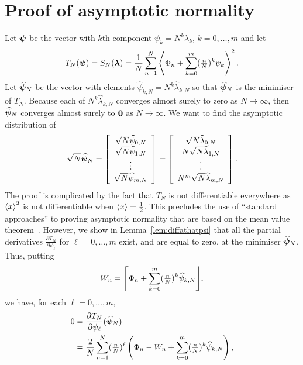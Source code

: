 \documentclass[journal]{IEEEtran}
\begin{document}
\section{Proof of asymptotic normality}\label{sec:centlimitproof}

Let $\boldsymbol{\psi}$ be the vector with $k$th component $\psi_k = N^k \lambda_k$, $k=0, \dots, m$ and let 
\[
T_{N}(\boldsymbol{\psi}) = S_N(\boldsymbol{\lambda}) = \frac{1}{N} \sum_{n=1}^{N} \left\langle  \Phi_n + \sum_{k=0}^m (\tfrac{n}{N})^k \psi_k  \right\rangle^2.
\]
Let $\widehat{\boldsymbol{\psi}}_N$ be the vector with elements $\widehat{\psi}_{k,N} = N^k \widehat{\lambda}_{k,N}$ so that $\widehat{\boldsymbol{\psi}}_N$ is the minimiser of $T_N$.  Because each of $N^k \widehat{\lambda}_{k,N}$ converges almost surely to zero as $N \rightarrow \infty$, then $\widehat{\boldsymbol{\psi}}_{N}$ converges almost surely to $\boldsymbol{0}$ as $N \rightarrow \infty$.  We want to find the asymptotic distribution of
\[
\sqrt{N}\widehat{\psibf}_{N} = 
\left[
\begin{array}
[c]{c}%
\sqrt{N} \widehat{\psi}_{0,N} \\ \sqrt{N}\widehat{\psi}_{1,N}  \\ \vdots \\ \sqrt{N} \widehat{\psi}_{m,N}
\end{array}
\right]
=
\left[
\begin{array}
[c]{c}%
\sqrt{N} \widehat{\lambda}_{0,N} \\ N\sqrt{N}\widehat{\lambda}_{1,N} \\ \vdots \\ N^m\sqrt{N} \widehat{\lambda}_{m,N}
\end{array}
\right].
\]
The proof is complicated by the fact that $T_N$ is not differentiable everywhere as $\left\langle x \right\rangle^2$ is not differentiable when $\left\langle x \right\rangle = \tfrac{1}{2}$.  This precludes the use of ``standard approaches'' to proving asymptotic normality that are based on the mean value theorem~\cite{vonMises_diff_stats_1947,vanDerVart1971_asymptotic_stats,Pollard_new_ways_clts_1986,Pollard_conv_stat_proc_1984,Pollard_asymp_empi_proc_1989}.  However, we show in Lemma~\ref{lem:diffathatpsi} that all the partial derivatives $\frac{\partial T_N}{\partial \psi_\ell}$ for $\ell = 0, \dots, m$ exist, and are equal to zero, at the minimiser $\widehat{\boldsymbol{\psi}}_N$.  Thus, putting
\begin{equation}\label{eq:Wn}
W_{n} = \round{\Phi_n + \sum_{k=0}^m (\tfrac{n}{N})^k \widehat{\psi}_{k,N}},
\end{equation}
we have, for each $\ell = 0, \dots, m$,
\begin{align*}
0 & = \frac{\partial T_N}{\partial \psi_\ell}(\widehat{\boldsymbol{\psi}}_N)\\
&= \frac{2}{N}\sum_{n=1}^{N}(\tfrac{n}{N})^\ell\left( \Phi_n - W_{n}+ \sum_{k=0}^{m}(\tfrac{n}{N})^k \widehat{\psi}_{k,N}  \right),
\end{align*}
\end{document}
